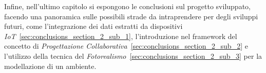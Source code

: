 Infine, nell'ultimo capitolo si espongono le conclusioni sul progetto sviluppato, facendo una panoramica sulle possibili strade
da intraprendere per degli sviluppi futuri, come l'integrazione dei dati estratti da dispositivi
\emph{IoT}~\ref{sec:conclusions_section_2_sub_1},
l'introduzione nel framework del concetto di \emph{Progettazione Collaborativa}~\ref{sec:conclusions_section_2_sub_2}
e l'utilizzo della tecnica del \emph{Fotorealismo}~\ref{sec:conclusions_section_2_sub_3} per la modellazione di un ambiente.

